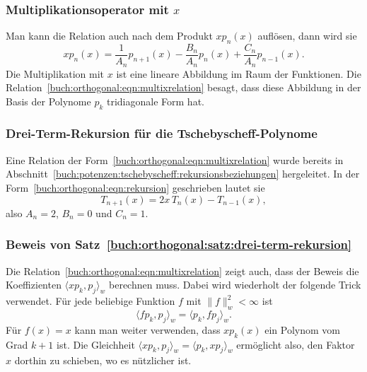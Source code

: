 \subsubsection{Multiplikationsoperator mit $x$}
Man kann die Relation auch nach dem Produkt $xp_n(x)$ auflösen, dann
wird sie
\begin{equation}
xp_n(x)
=
\frac{1}{A_n}p_{n+1}(x)
-
\frac{B_n}{A_n}p_n(x)
+
\frac{C_n}{A_n}p_{n-1}(x).
\label{buch:orthogonal:eqn:multixrelation}
\end{equation}
Die Multiplikation mit $x$ ist eine lineare Abbildung im Raum der Funktionen.
Die Relation~\eqref{buch:orthogonal:eqn:multixrelation} besagt, dass diese
Abbildung in der Basis der Polynome $p_k$ tridiagonale Form hat.

\subsubsection{Drei-Term-Rekursion für die Tschebyscheff-Polynome}
Eine Relation der Form~\eqref{buch:orthogonal:eqn:multixrelation}
wurde bereits in 
Abschnitt~\ref{buch:potenzen:tschebyscheff:rekursionsbeziehungen}
hergeleitet.
In der Form~\eqref{buch:orthogonal:eqn:rekursion} geschrieben lautet
sie
\[
T_{n+1}(x) = 2x\,T_n(x)-T_{n-1}(x),
\]
also
$A_n=2$, $B_n=0$ und $C_n=1$.

\subsubsection{Beweis von Satz~\ref{buch:orthogonal:satz:drei-term-rekursion}}
Die Relation~\eqref{buch:orthogonal:eqn:multixrelation} zeigt auch,
dass der Beweis die Koeffizienten $\langle xp_k,p_j\rangle_w$
berechnen muss.
Dabei wird wiederholt der folgende Trick verwendet.
Für jede beliebige Funktion $f$ mit $\|f\|_w^2<\infty$ ist
\[
\langle fp_k,p_j\rangle_w
=
\langle p_k,fp_j\rangle_w.
\]
Für $f(x)=x$ kann man weiter verwenden, dass $xp_k(x)$ ein Polynom
vom Grad $k+1$ ist.
Die Gleichheit $\langle xp_k,p_j\rangle_w=\langle p_k,xp_j\rangle_w$
ermöglicht also, den Faktor $x$ dorthin zu schieben, wo es nützlicher ist.

